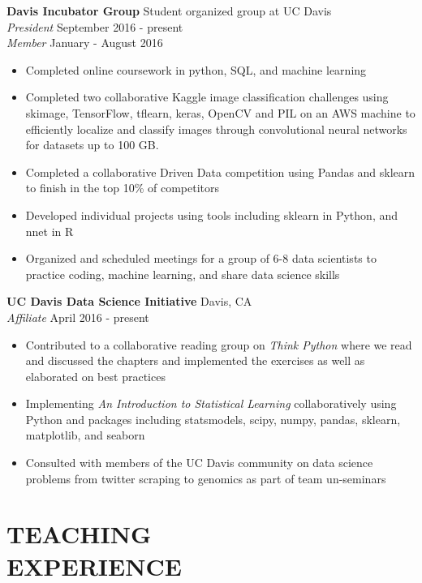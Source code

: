 \documentclass[line,margin,10pt]{res}
\begin{document}
\begin{resume}
\textbf{Davis Incubator Group} \hfill Student organized group at UC Davis\\
{\sl President} \hfill September 2016 - present\\
{\sl Member} \hfill January - August 2016 
\begin{itemize} \itemsep -2pt
\item Completed online coursework in python, SQL, and machine learning
\item Completed two collaborative Kaggle image classification challenges using skimage, TensorFlow, tflearn, keras, OpenCV and PIL on an AWS machine to efficiently localize and classify images through convolutional neural networks for datasets up to 100 GB.
\item Completed a collaborative Driven Data competition using Pandas and sklearn to finish in the top 10\% of competitors
\item Developed individual projects using tools including sklearn in Python, and nnet in R
\item Organized and scheduled meetings for a group of 6-8 data scientists to practice coding, machine learning, and share data science skills
\end{itemize}

\textbf{UC Davis Data Science Initiative} \hfill  Davis, CA \\
{\sl Affiliate} \hfill April 2016 - present
\begin{itemize} \itemsep -2pt
\item Contributed to a collaborative reading group on {\sl Think Python} where we read and discussed the chapters and implemented the exercises as well as elaborated on best practices
\item Implementing {\sl An Introduction to Statistical Learning} collaboratively using Python and packages including statsmodels, scipy, numpy, pandas, sklearn, matplotlib, and seaborn
\item Consulted with members of the UC Davis community on data science problems from twitter scraping to genomics as part of team un-seminars
\end{itemize}
 
  \section{TEACHING\\EXPERIENCE} 
  

\end{resume}
\end{document}
